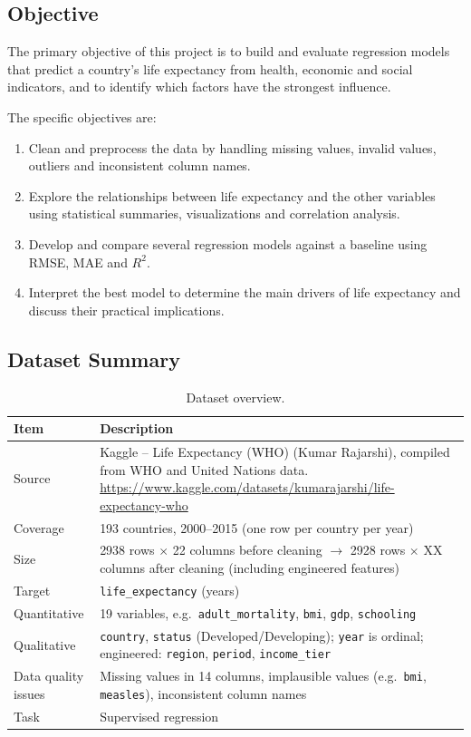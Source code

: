 \documentclass[12pt,a4paper]{article}
\begin{document}
\subsection{Objective}
The primary objective of this project is to build and evaluate regression models
that predict a country's life expectancy from health, economic and social
indicators, and to identify which factors have the strongest influence.

The specific objectives are:
\begin{enumerate}
  \item Clean and preprocess the data by handling missing values, invalid
        values, outliers and inconsistent column names.
  \item Explore the relationships between life expectancy and the other
        variables using statistical summaries, visualizations and correlation
        analysis.
  \item Develop and compare several regression models against a baseline using
        RMSE, MAE and $R^2$.
  \item Interpret the best model to determine the main drivers of life
        expectancy and discuss their practical implications.
\end{enumerate}

\subsection{Dataset Summary}
\begin{table}[H]\centering
\caption{Dataset overview.}
\begin{tabularx}{\textwidth}{lX}\toprule
\textbf{Item} & \textbf{Description}\\\midrule
Source & Kaggle -- Life Expectancy (WHO) (Kumar Rajarshi), compiled from WHO and United Nations data. \url{https://www.kaggle.com/datasets/kumarajarshi/life-expectancy-who}\\
Coverage & 193 countries, 2000--2015 (one row per country per year)\\
Size & 2938 rows $\times$ 22 columns before cleaning $\rightarrow$ 2928 rows $\times$ XX columns after cleaning (including engineered features)\\
Target & \texttt{life\_expectancy} (years)\\
Quantitative & 19 variables, e.g.\ \texttt{adult\_mortality}, \texttt{bmi}, \texttt{gdp}, \texttt{schooling}\\
Qualitative & \texttt{country}, \texttt{status} (Developed/Developing); \texttt{year} is ordinal; engineered: \texttt{region}, \texttt{period}, \texttt{income\_tier}\\
Data quality issues & Missing values in 14 columns, implausible values (e.g.\ \texttt{bmi}, \texttt{measles}), inconsistent column names\\
Task & Supervised regression\\\bottomrule
\end{tabularx}
\end{table}
\end{document}
